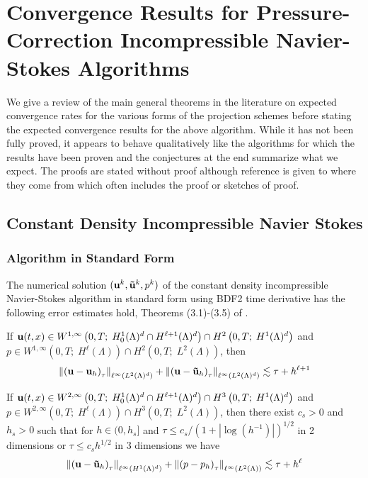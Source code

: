 \documentclass[letterpaper]{erdc}
\begin{document}
\appendix


%
%
%
%
\chapter{Convergence Results for Pressure-Correction Incompressible Navier-Stokes Algorithms}\label{ch:LiteratureReview}
We give a review of the main general theorems in the literature on expected convergence rates for the various forms of the projection schemes before stating the expected convergence results for the above algorithm.  While it has not been fully proved, it appears to behave qualitatively like the algorithms for which the results have been proven and the conjectures at the end summarize what we expect.  The proofs are stated without proof although reference is given to where they come from which often includes the proof or sketches of proof.

%
%
%
\section{Constant Density Incompressible Navier Stokes}

%
%
\subsection{Algorithm in Standard Form}
The numerical solution $(\textbf{u}^k, \mathbf{\tilde{u}}^k,p^k)$ of the constant density incompressible Navier-Stokes algorithm in standard form using BDF2 time derivative has the following error estimates hold, Theorems (3.1)-(3.5) of \cite{guermond1997resultat}.

\begin{theorem}\label{thm:guermondthm3.1}
If $\textbf{u}(t,x)\in W^{1,\infty}\left(0,T;\; H_0^1(\Lambda)^d \cap H^{\ell+1}(\Lambda)^d  \right) \cap H^2\left(0,T;\; H^1(\Lambda)^d\right)$ and $p\in W^{1,\infty}\left(0,T;\; H^{\ell}(\Lambda) \right)\cap H^2\left(0,T;\; L^2(\Lambda)\right)$, then
  \begin{equation}
    \left\| \left(\textbf{u} - \textbf{u}_h \right)_{\tau} \right\|_{\ell^{\infty}\left(L^2(\Lambda)^d\right)} + \left\| \left(\textbf{u} - \mathbf{\tilde{u}}_h \right)_{\tau} \right\|_{\ell^{\infty}\left(L^2(\Lambda)^d\right)} \lesssim \tau + h^{\ell+1}
  \end{equation}
\end{theorem}

\begin{theorem}\label{thm:guermondthm3.2}
If $\textbf{u}(t,x)\in W^{2,\infty}\left(0,T;\; H_0^1(\Lambda)^d \cap H^{\ell+1}(\Lambda)^d  \right) \cap H^3\left(0,T;\; H^1(\Lambda)^d\right)$ and $p\in W^{2,\infty}\left(0,T;\; H^{\ell}(\Lambda) \right)\cap H^3\left(0,T;\; L^2(\Lambda)\right)$, then there exist $c_s>0$ and $h_s>0$ such that for $h\in (0,h_s]$ and $\tau \leq c_s /\left(1+|\log(h^{-1})| \right)^{1/2}$ in 2 dimensions or $\tau \leq c_s h^{1/2}$ in 3 dimensions we have
  \begin{equation}
    \left\| \left(\textbf{u} - \mathbf{\tilde{u}}_h \right)_{\tau} \right\|_{\ell^{\infty}\left(H^1(\Lambda)^d\right)} + \left\| \left(p - p_h \right)_{\tau} \right\|_{\ell^{\infty}\left(L^2(\Lambda)\right)} \lesssim \tau + h^{\ell}
  \end{equation}
\end{theorem}
\end{document}
